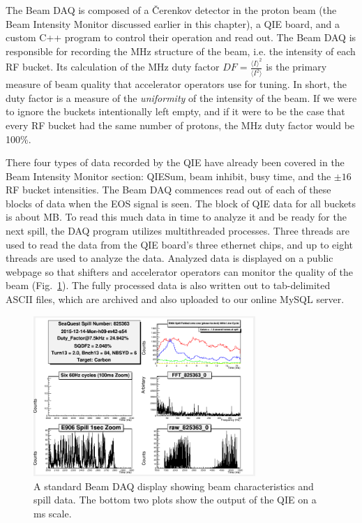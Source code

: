 The Beam DAQ is composed of a \v{C}erenkov detector in the proton beam (the Beam Intensity Monitor discussed earlier in this chapter), a QIE board, and a custom C++ program to control their operation and read out. The Beam DAQ is responsible for recording the \unit[53]{MHz} structure of the beam, i.e. the intensity of each RF bucket. Its calculation of the \unit[53]{MHz} duty factor $DF=\frac{\langle I\rangle^{2}}{\langle I^{2}\rangle}$ is the primary measure of beam quality that accelerator operators use for tuning. In short, the duty factor is a measure of the \emph{uniformity} of the intensity of the beam. If we were to ignore the buckets intentionally left empty, and if it were to be the case that every RF bucket had the same number of protons, the \unit[53]{MHz} duty factor would be 100\%.

There four types of data recorded by the QIE have already been covered in the Beam Intensity Monitor section: QIESum, beam inhibit, busy time, and the $\pm16$ RF bucket intensities. The Beam DAQ commences read out of each of these blocks of data when the EOS signal is seen. The block of QIE data for all buckets is about \unit[300]{MB}. To read this much data in time to analyze it and be ready for the next spill, the DAQ program utilizes multithreaded processes. Three threads are used to read the data from the QIE board's three ethernet chips, and up to eight threads are used to analyze the data. Analyzed data is displayed on a public webpage so that shifters and accelerator operators can monitor the quality of the beam (Fig.~\ref{fig:beamdaq}). The fully processed data is also written out to tab-delimited ASCII files, which are archived and also uploaded to our online MySQL server.

\begin{figure}
	\centering
	\includegraphics[width=0.75\textwidth]{figures/apparatus/E906FFT-scalerDAQ.png}
	\caption{A standard Beam DAQ display showing beam characteristics and spill data. The bottom two plots show the output of the QIE on a \unit[]{ms} scale.}
	\label{fig:beamdaq}
\end{figure}

